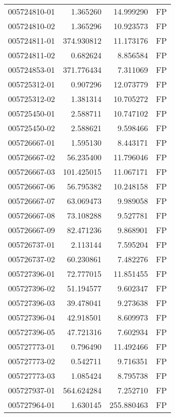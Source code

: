\begin{tabular}{lrrl}
005724810-01 &    1.365260 &      14.999290 &   FP \\
005724810-02 &    1.365296 &      10.923573 &   FP \\
005724811-01 &  374.930812 &      11.173176 &   FP \\
005724811-02 &    0.682624 &       8.856584 &   FP \\
005724853-01 &  371.776434 &       7.311069 &   FP \\
005725312-01 &    0.907296 &      12.073779 &   FP \\
005725312-02 &    1.381314 &      10.705272 &   FP \\
005725450-01 &    2.588711 &      10.747102 &   FP \\
005725450-02 &    2.588621 &       9.598466 &   FP \\
005726667-01 &    1.595130 &       8.443171 &   FP \\
005726667-02 &   56.235400 &      11.796046 &   FP \\
005726667-03 &  101.425015 &      11.067171 &   FP \\
005726667-06 &   56.795382 &      10.248158 &   FP \\
005726667-07 &   63.069473 &       9.989058 &   FP \\
005726667-08 &   73.108288 &       9.527781 &   FP \\
005726667-09 &   82.471236 &       9.868901 &   FP \\
005726737-01 &    2.113144 &       7.595204 &   FP \\
005726737-02 &   60.230861 &       7.482276 &   FP \\
005727396-01 &   72.777015 &      11.851455 &   FP \\
005727396-02 &   51.194577 &       9.602347 &   FP \\
005727396-03 &   39.478041 &       9.273638 &   FP \\
005727396-04 &   42.918501 &       8.609973 &   FP \\
005727396-05 &   47.721316 &       7.602934 &   FP \\
005727773-01 &    0.796490 &      11.492466 &   FP \\
005727773-02 &    0.542711 &       9.716351 &   FP \\
005727773-03 &    1.085424 &       8.795738 &   FP \\
005727937-01 &  564.624284 &       7.252710 &   FP \\
005727964-01 &    1.630145 &     255.880463 &   FP \\

\end{tabular}
